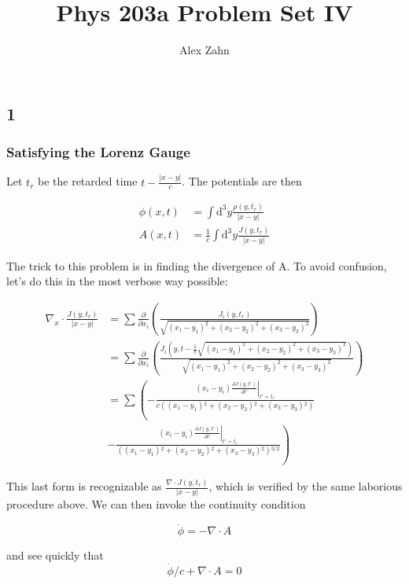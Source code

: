 \documentclass[12pt]{article}
\author{Alex Zahn}
\title{Phys 203a Problem Set IV}
\date{}
\begin{document}
\maketitle
\subsection*{1}

\subsubsection*{Satisfying the Lorenz Gauge}

Let \(t_r\) be the retarded time \(t-\frac{|x-y|}{c}\). The potentials are then

\begin{align*}
\phi(x,t) &= \int\mathrm{d}^3y\frac{\rho(y,t_r)}{|x-y|} \\[6pt]
A(x,t) &= \frac{1}{c}\int\mathrm{d}^3y\frac{J(y,t_r)}{|x-y|} 
\end{align*}

The trick to this problem is in finding the divergence of A. To avoid confusion, let's do this in the most verbose way possible:

\begin{align*}
\nabla_x \cdot \frac{J(y,t_r)}{|x-y|} &= \sum \frac{\partial}{\partial x_i}\left( \frac{J_i(y,t_r)}{\sqrt{(x_1-y_1)^2+(x_2-y_2)^2+(x_3-y_3)^2}}  \right) \\[12pt]
%
%
%
&= \sum 
\frac{\partial}{\partial x_i}\left( \frac{J_i(y,t - \frac{1}{c} \sqrt{(x_1-y_1)^2+(x_2-y_2)^2+(x_3-y_3)^2} )}{\sqrt{(x_1-y_1)^2+(x_2-y_2)^2+(x_3-y_3)^2}}  \right) \\[12pt]
%
%
%
&= \sum\left(
	-\frac{
		(x_i-y_i)\left.\frac{\partial J (y,t')}{\partial t'}\right|_{t'=t_r}
			}{c \left(\left(x_1-y_1\right){}^2+\left(x_2-y_2\right){}^2+\left(x_3-y_3\right){}^2\right)}   \right. \\[12pt]
%
&\left. -  \frac{(x_i-y_i)\left.\frac{\partial J (y,t')}{\partial t'}\right|_{t'=t_r}}{\left(\left(x_1-y_1\right){}^2+\left(x_2-y_2\right){}^2+\left(x_3-y_3\right){}^2\right){}^{3/2}}  \right)
\end{align*}

This last form is recognizable as \(\frac{\nabla \cdot J(y,t_r)}{|x-y|}\), which is verified by the same laborious procedure above. We can then invoke the continuity condition

\[ \dot{\phi} = -\nabla \cdot A
\]
 
and see quickly that 
\[ \dot{\phi}/c + \nabla \cdot A = 0
\]
\end{document}
